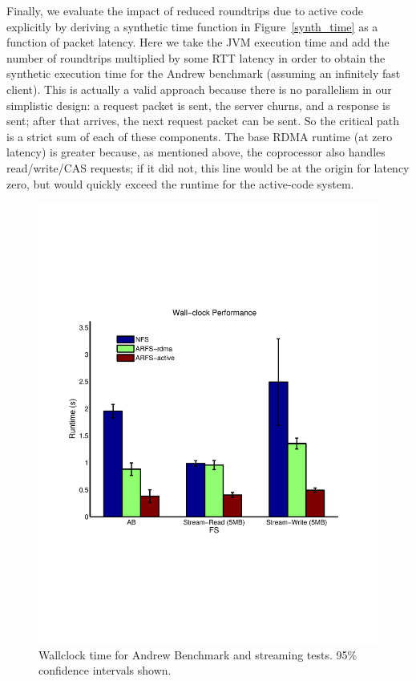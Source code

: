 \documentclass[10pt]{article}
\begin{document}
Finally, we evaluate the impact of reduced roundtrips due to active
code explicitly by deriving a synthetic time function in
Figure~\ref{synth_time} as a function of packet latency. Here we take
the JVM execution time and add the number of roundtrips multiplied by
some RTT latency in order to obtain the synthetic execution time for
the Andrew benchmark (assuming an infinitely fast client). This is
actually a valid approach because there is no parallelism in our
simplistic design: a request packet is sent, the server churns, and a
response is sent; after that arrives, the next request packet can be
sent. So the critical path is a strict sum of each of these
components. The base RDMA runtime (at zero latency) is greater
because, as mentioned above, the coprocessor also handles
read/write/CAS requests; if it did not, this line would be at the
origin for latency zero, but would quickly exceed the runtime for the
active-code system.

\begin{figure}
  \centering
\includegraphics[scale=0.5, trim = 0 200 0 200]{../../results/matlab/wallclock.pdf}
  \caption{Wallclock time for Andrew Benchmark and streaming tests. 95\% confidence intervals shown.}\label{wallclock}
\end{figure}
\end{document}
